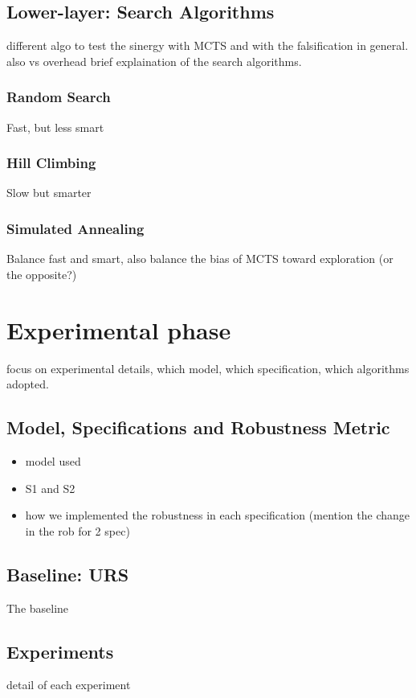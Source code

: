 \documentclass[11pt]{article}
\begin{document}
\subsection{Lower-layer: Search Algorithms}
different algo to test the sinergy with MCTS and with the falsification in general. also vs overhead
brief explaination of the search algorithms.

\subsubsection{Random Search}
Fast, but less smart
\subsubsection{Hill Climbing}
Slow but smarter
\subsubsection{Simulated Annealing}
Balance fast and smart, also balance the bias of MCTS toward exploration (or the opposite?)

\pagebreak

\section{Experimental phase}
focus on experimental details, which model, which specification, which algorithms adopted.

\subsection{Model, Specifications and Robustness Metric}
\begin{itemize}
    \item model used
    \item S1 and S2
    \item how we implemented the robustness in each specification (mention the change in the rob for 2 spec)
\end{itemize}

\subsection{Baseline: URS}
The baseline

\subsection{Experiments}
detail of each experiment
\end{document}
